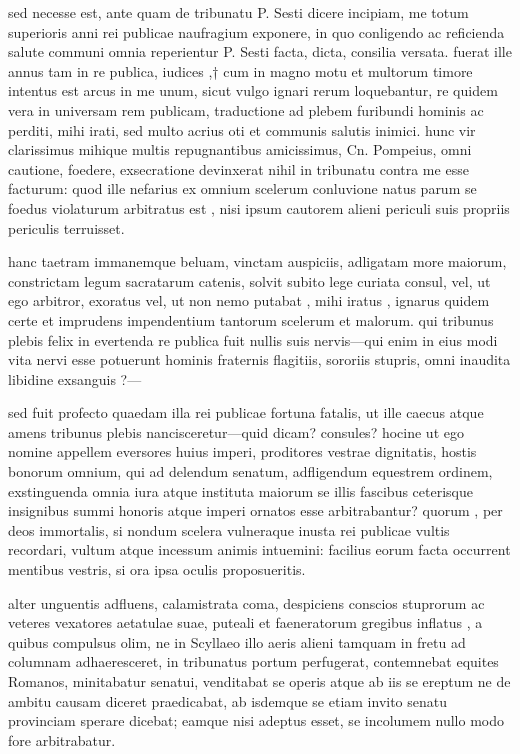  sed necesse est, ante quam de tribunatu P. Sesti dicere incipiam, me totum superioris anni rei publicae naufragium exponere, in quo conligendo ac reficienda salute communi omnia reperientur P. Sesti facta, dicta, consilia versata. fuerat ille annus tam in re publica, iudices ,† cum in magno motu et multorum timore intentus est arcus in me unum, sicut vulgo ignari rerum loquebantur, re quidem vera in universam rem publicam, traductione ad plebem furibundi hominis ac perditi, mihi irati, sed multo acrius oti et communis salutis inimici. hunc vir clarissimus mihique multis repugnantibus amicissimus, Cn. Pompeius, omni cautione, foedere, exsecratione devinxerat nihil in tribunatu contra me esse facturum: quod ille nefarius ex omnium scelerum conluvione natus parum se foedus violaturum arbitratus est , nisi ipsum cautorem alieni periculi suis propriis periculis terruisset.

 hanc taetram immanemque beluam, vinctam auspiciis, adligatam more maiorum, constrictam legum sacratarum catenis, solvit subito lege curiata consul, vel, ut ego arbitror, exoratus vel, ut non nemo putabat , mihi iratus , ignarus quidem certe et imprudens impendentium tantorum scelerum et malorum. qui tribunus plebis felix in evertenda re publica fuit nullis suis nervis—qui enim in eius modi vita nervi esse potuerunt hominis fraternis flagitiis, sororiis stupris, omni inaudita libidine exsanguis ?—

 sed fuit profecto quaedam illa rei publicae fortuna fatalis, ut ille caecus atque amens tribunus plebis nancisceretur—quid dicam? consules? hocine ut ego nomine appellem eversores huius imperi, proditores vestrae dignitatis, hostis bonorum omnium, qui ad delendum senatum, adfligendum equestrem ordinem, exstinguenda omnia iura atque instituta maiorum se illis fascibus ceterisque insignibus summi honoris atque imperi ornatos esse arbitrabantur? quorum , per deos immortalis, si nondum scelera vulneraque inusta rei publicae vultis recordari, vultum atque incessum animis intuemini: facilius eorum facta occurrent mentibus vestris, si ora ipsa oculis proposueritis.

 alter unguentis adfluens, calamistrata coma, despiciens conscios stuprorum ac veteres vexatores aetatulae suae, puteali et faeneratorum gregibus inflatus , a quibus compulsus olim, ne in Scyllaeo illo aeris alieni tamquam in fretu ad columnam adhaeresceret, in tribunatus portum perfugerat, contemnebat equites Romanos, minitabatur senatui, venditabat se operis atque ab iis se ereptum ne de ambitu causam diceret praedicabat, ab isdemque se etiam invito senatu provinciam sperare dicebat; eamque nisi adeptus esset, se incolumem nullo modo fore arbitrabatur.

